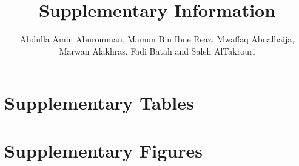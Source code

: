 \documentclass[11pt]{article}
\title{Supplementary Information\\[1ex]{\Large\paperTitle}}
\author{Abdulla Amin Aburomman, Mamun Bin Ibne Reaz, Mwaffaq Abualhaija,\\
  Marwan Alakhras, Fadi Batah and Saleh AlTakrouri}
\date{}
\begin{document}
\maketitle



\clearpage
\section*{Supplementary Tables}

\clearpage
\section*{Supplementary Figures}

\end{document}
